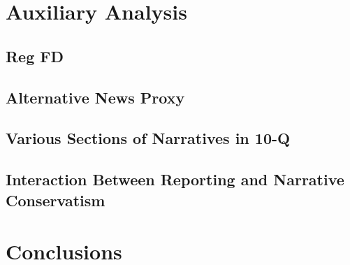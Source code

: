 \documentclass[a4paper]{article}
\begin{document}
\begin{spacing}{2}
\section{Auxiliary Analysis}

\subsection{Reg FD}

\subsection{Alternative News Proxy}

\subsection{Various Sections of Narratives in 10-Q}

\subsection{Interaction Between Reporting and Narrative Conservatism}

\section{Conclusions}

\end{spacing}

\newpage



\newpage


\newpage


\newpage


\newpage
\setcounter{page}{1}

\end{document}
